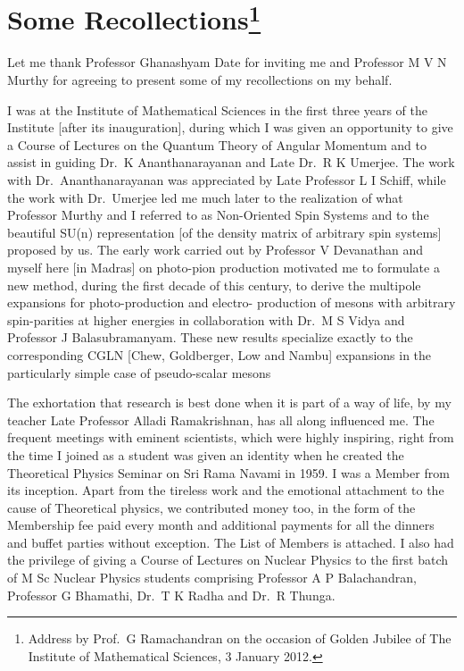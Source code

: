 \chapter[Some Recollection]{Some Recollections\footnote[*]{Address by Prof.\ G Ramachandran on the occasion of Golden Jubilee of The Institute of Mathematical Sciences, 3 January 2012.}}\label{chap2}

\medskip

Let me thank Professor Ghanashyam Date for inviting me and Professor M V N Murthy
for agreeing to present some of my recollections on my behalf.

I was at the Institute of Mathematical Sciences in the first three years of the
Institute [after its inauguration], during which I was given an opportunity to give
a Course of Lectures on the Quantum Theory of Angular Momentum and to assist
in guiding Dr.\ K Ananthanarayanan and Late Dr.\ R K Umerjee. The work with Dr.\ 
Ananthanarayanan was appreciated by Late Professor L I Schiff, while the work with
Dr.\ Umerjee led me much later to the realization of what Professor Murthy and I
referred to as Non-Oriented Spin Systems and to the beautiful SU(n) representation
[of the density matrix of arbitrary spin systems] proposed by us. The early work
carried out by Professor V Devanathan and myself here [in Madras] on photo-pion
production motivated me to formulate a new method, during the first decade of
this century, to derive the multipole expansions for photo-production and electro-
production of mesons with arbitrary spin-parities at higher energies in collaboration
with Dr.\ M S Vidya and Professor J Balasubramanyam. These new results specialize
exactly to the corresponding CGLN [Chew, Goldberger, Low and Nambu] expansions
in the particularly simple case of pseudo-scalar mesons

The exhortation that research is best done when it is part of a way of life, by
my teacher Late Professor Alladi Ramakrishnan, has all along influenced me. The
frequent meetings with eminent scientists, which were highly inspiring, right from
the time I joined as a student was given an identity when he created the Theoretical
Physics Seminar on Sri Rama Navami in 1959. I was a Member from its inception.
Apart from the tireless work and the emotional attachment to the cause of\break 
Theoretical physics, we contributed money too, in the form of the Membership fee paid every
month and additional payments for all the dinners and buffet parties without exception. 
The List of Members is attached. I also had the privilege of giving a Course
of Lectures on Nuclear Physics to the first batch of M Sc Nuclear Physics students
comprising Professor A P Balachandran, Professor G Bhamathi, Dr.\ T K Radha and
Dr.\ R Thunga.

